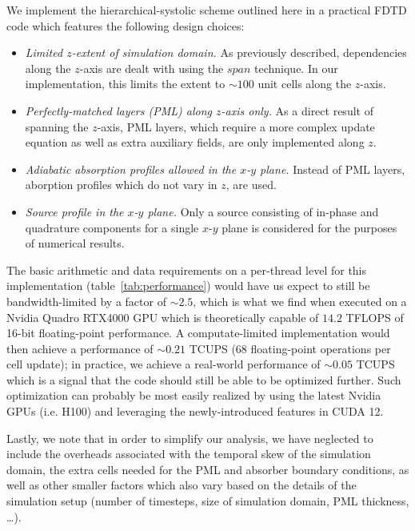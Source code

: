 \documentclass[12pt]{article}
\begin{document}
We implement the hierarchical-systolic scheme outlined here
  in a practical FDTD code which features the following design choices:

\begin{itemize}
  \item \emph{Limited $z$-extent of simulation domain.}
        As previously described,
          dependencies along the $z$-axis
          are dealt with using the $span$ technique.
        In our implementation, this limits the extent to $\sim 100$ unit cells
          along the $z$-axis.
  \item \emph{Perfectly-matched layers (PML) along $z$-axis only.}
        As a direct result of spanning the $z$-axis,
          PML layers, which require a more complex update equation
          as well as extra auxiliary fields,
          are only implemented along $z$.
  \item \emph{Adiabatic absorption profiles allowed in the $x$-$y$ plane.}
        Instead of PML layers, aborption profiles which do not vary in $z$,
          are used.
  \item \emph{Source profile in the $x$-$y$ plane.}
        Only a source consisting of in-phase and quadrature components
          for a single $x$-$y$ plane is considered
          for the purposes of numerical results.
\end{itemize}

The basic arithmetic and data requirements on a per-thread level
  for this implementation (table~\ref{tab:performance})
  would have us expect to still be bandwidth-limited by a factor of $\sim 2.5$,
  which is what we find when executed on a Nvidia Quadro RTX4000 GPU
  which is theoretically capable of $14.2$ TFLOPS
  of 16-bit floating-point performance.
A computate-limited implementation
  would then achieve a performance of $\sim 0.21$ TCUPS
  ($68$ floating-point operations per cell update);
  in practice, we achieve a real-world performance of $\sim 0.05$ TCUPS
  which is a signal that the code should still be able to be optimized further.
Such optimization can probably be most easily realized
  by using the latest Nvidia GPUs (i.e. H100) 
  and leveraging the newly-introduced features in CUDA 12.

Lastly, we note that in order to simplify our analysis,
  we have neglected to include the overheads
  associated with the temporal skew of the simulation domain,
  the extra cells needed for the PML and absorber boundary conditions, 
  as well as other smaller factors which also vary
  based on the details of the simulation setup
  (number of timesteps, size of simulation domain, PML thickness, \ldots).
\end{document}
